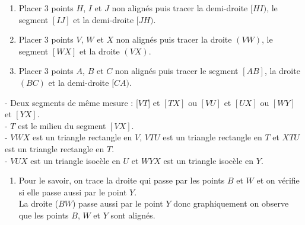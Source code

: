\documentclass[a4paper,12pt]{report}
\begin{document}
\begin{Correction}
\begin{EXO}{}{}
\begin{multicols}{2}
\begin{enumerate}[]
\item \begin{minipage}[t]{\linewidth}Placer 3 points $H$, $I$ et $J$ non alignés puis tracer la demi-droite $[HI)$, le segment $[IJ]$ et la demi-droite $[JH)$.\end{minipage}
\item \begin{minipage}[t]{\linewidth}Placer 3 points $V$, $W$ et $X$ non alignés puis tracer la droite $(VW)$, le segment $[WX]$ et la droite $(VX)$.\end{minipage}
\item \begin{minipage}[t]{\linewidth}Placer 3 points $A$, $B$ et $C$ non alignés puis tracer le segment $[AB]$, la droite $(BC)$ et la demi-droite $[CA)$.\end{minipage}
\end{enumerate}
\end{multicols}

\end{EXO}

\begin{EXO}{}{}

 - Deux segments de même mesure : [$VT$] et $[TX]$ ou $[VU]$ et $[UX]$ ou $[WY]$ et $[YX]$.\\- $T$ est le milieu du segment $[VX]$.\\- $VWX$ est un triangle rectangle en $V$, $VTU$ est un triangle rectangle en $T$ et $XTU$ est un triangle rectangle en $T$.\\- $VUX$ est un triangle isocèle en $U$ et $WYX$ est un triangle isocèle en $Y$.\\
\end{EXO}

\begin{EXO}{}{}

\begin{enumerate}[]
\item Pour le savoir, on trace la droite qui passe par les points $B$ et $W$ et on vérifie si elle passe aussi par le point $Y$.\\La droite ($BW$) passe aussi par le point $Y$ donc graphiquement on observe que les points $B$, $W$ et $Y$ sont alignés.\\\begin{tikzpicture}[baseline]


\end{tikzpicture}
\end{enumerate}
\end{EXO}
\end{Correction}
\end{document}
